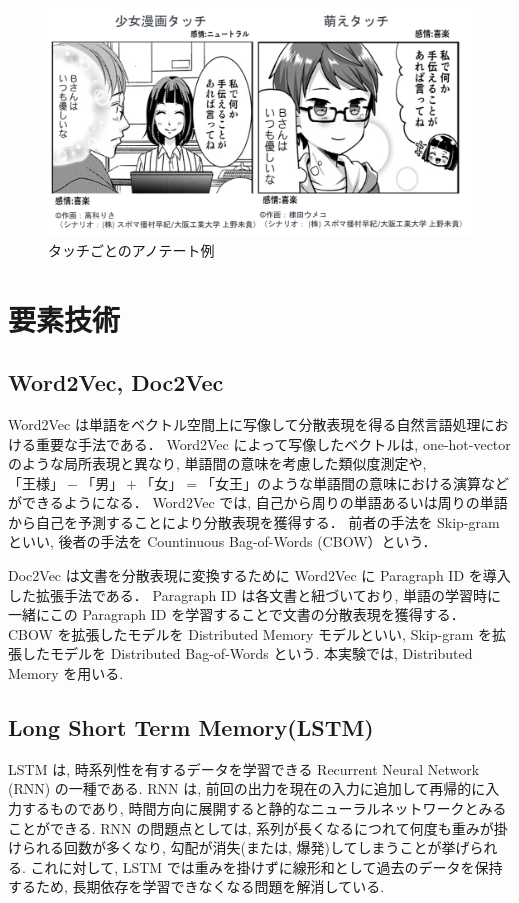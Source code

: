 \documentclass[twocolumn]{jarticle}     %
\begin{document}
\begin{figure}[t]
  \centering
  \includegraphics[width=\linewidth]{4koma.png}
  \caption{タッチごとのアノテート例}
  \label{fig:4koma}
\end{figure}

\section{要素技術}
\subsection{Word2Vec, Doc2Vec}
Word2Vec \cite{word2vec}は単語をベクトル空間上に写像して分散表現を得る自然言語処理における重要な手法である．
Word2Vec によって写像したベクトルは, one-hot-vector のような局所表現と異なり, 単語間の意味を考慮した類似度測定や, $「王様」-「男」+「女」=「女王」$のような単語間の意味における演算などができるようになる．
Word2Vec では, 自己から周りの単語あるいは周りの単語から自己を予測することにより分散表現を獲得する．
前者の手法を Skip-gram といい, 後者の手法を Countinuous Bag-of-Words (CBOW）という．

Doc2Vec \cite{word2vec}は文書を分散表現に変換するために Word2Vec に Paragraph ID を導入した拡張手法である．
Paragraph ID は各文書と紐づいており, 単語の学習時に一緒にこの Paragraph ID を学習することで文書の分散表現を獲得する．
CBOW を拡張したモデルを Distributed Memory モデルといい, Skip-gram を拡張したモデルを Distributed Bag-of-Words という. 本実験では, Distributed Memory を用いる.

\subsection{Long Short Term Memory(LSTM)}
LSTM は, 時系列性を有するデータを学習できる Recurrent Neural Network (RNN) の一種である.
RNN は, 前回の出力を現在の入力に追加して再帰的に入力するものであり, 時間方向に展開すると静的なニューラルネットワークとみることができる. RNN の問題点としては, 系列が長くなるにつれて何度も重みが掛けられる回数が多くなり, 勾配が消失(または, 爆発)してしまうことが挙げられる. これに対して, LSTM では重みを掛けずに線形和として過去のデータを保持するため, 長期依存を学習できなくなる問題を解消している.
\end{document}
